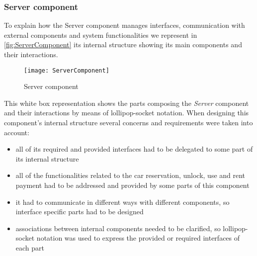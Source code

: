 \subsubsection{Server component}
To explain how the Server component manages interfaces, communication with external components and system functionalities we represent in \autoref{fig:ServerComponent} its internal structure showing its main components and their interactions.
\\

\begin{figure}[h]
			\centering
			\texttt{[image: ServerComponent]}
			\caption{
				\label{fig:ServerComponent} 
				Server component
			}
		\end{figure}
\clearpage

This white box representation shows the parts composing the \emph{Server} component and their interactions by means of lollipop-socket notation. When designing this component's internal structure several concerns and requirements were taken into account:
\begin{itemize}
	\item all of its required and provided interfaces had to be delegated to some part of its internal structure
	\item all of the functionalities related to the car reservation, unlock, use and rent payment had to be addressed and provided by some parts of this component
	\item it had to communicate in different ways with different components, so interface specific parts had to be designed
	\item associations between internal components needed to be clarified, so lollipop-socket notation was used to express the provided or required interfaces of each part
\end{itemize}



